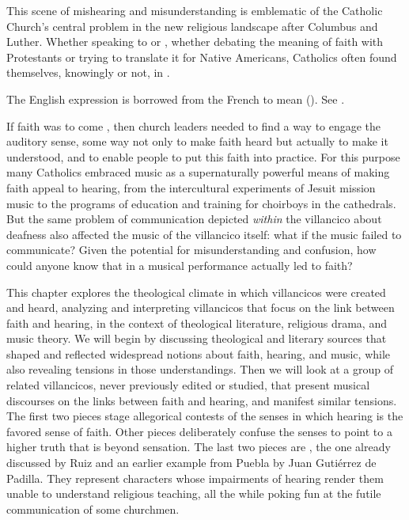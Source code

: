 
This scene of mishearing and misunderstanding is emblematic of the Catholic
Church's central problem in the new religious landscape after Columbus and
Luther.
Whether speaking to  or , whether debating the
meaning of faith with Protestants or trying to translate it for Native
Americans, Catholics often found themselves, knowingly or not, in
.%
\begin{Footnote}
    The English expression is borrowed from the French 
    to mean 
    (\autocite[]{OED}).
    See \autocite{MacGaffey:DialoguesDeaf}.
\end{Footnote}

If faith was to come , then church leaders needed to
find a way to engage the auditory sense, some way not only to make faith heard
but actually to make it understood, and to enable people to put this faith into
practice.
For this purpose many Catholics embraced music as a supernaturally powerful
means of making faith appeal to hearing, from the intercultural experiments of
Jesuit mission music to the programs of education and training for choirboys in
the cathedrals.
But the same problem of communication depicted \emph{within} the villancico
about deafness also affected the music of the villancico itself: what if the
music failed to communicate?
Given the potential for misunderstanding and confusion, how could anyone know
that  in a musical performance actually led to faith?


This chapter explores the theological climate in which villancicos were created
and heard, analyzing and interpreting villancicos that focus on the link between
faith and hearing, in the context of theological literature, religious drama,
and music theory.
We will begin by discussing theological and literary sources that shaped and
reflected widespread notions about faith, hearing, and music, while also
revealing tensions in those understandings.
Then we will look at a group of related villancicos, never previously edited or
studied, that present musical discourses on the links between faith and hearing,
and manifest similar tensions.
The first two pieces stage allegorical contests of the senses in which hearing
is the favored sense of faith.
Other pieces deliberately confuse the senses to point to a higher truth that is
beyond sensation.
The last two pieces are , the one already
discussed by Ruiz and an earlier example from Puebla by Juan Gutiérrez de
Padilla.
They represent characters whose impairments of hearing render them unable to
understand religious teaching, all the while poking fun at the futile
communication of some churchmen.

